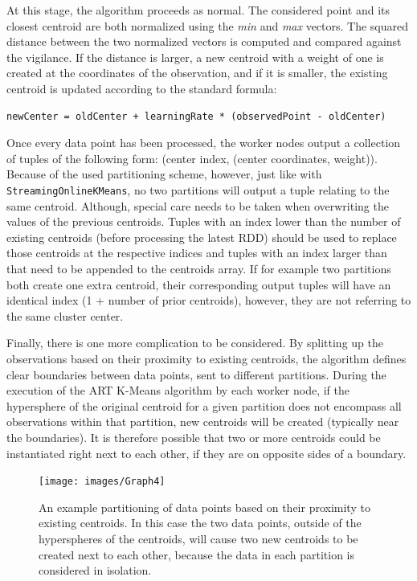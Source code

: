 \documentclass{l4proj}
\begin{document}
At this stage, the algorithm proceeds as normal. The considered point and its closest centroid are both normalized using the \textit{min} and \textit{max} vectors. The squared distance between the two normalized vectors is computed and compared against the vigilance. If the distance is larger, a new centroid with a weight of one is created at the coordinates of the observation, and if it is smaller, the existing centroid is updated according to the standard formula:

\begin{center}
\begin{BVerbatim}
newCenter = oldCenter + learningRate * (observedPoint - oldCenter)
\end{BVerbatim}
\end{center}

Once every data point has been processed, the worker nodes output a collection of tuples of the following form: (center index, (center coordinates, weight)). Because of the used partitioning scheme, however, just like with \texttt{StreamingOnlineKMeans}, no two partitions will output a tuple relating to the same centroid. Although, special care needs to be taken when overwriting the values of the previous centroids. Tuples with an index lower than the number of existing centroids (before processing the latest RDD) should be used to replace those centroids at the respective indices and tuples with an index larger than that need to be appended to the centroids array. If for example two partitions both create one extra centroid, their corresponding output tuples will have an identical index (1 + number of prior centroids), however, they are not referring to the same cluster center.

Finally, there is one more complication to be considered. By splitting up the observations based on their proximity to existing centroids, the algorithm defines clear boundaries between data points, sent to different partitions. During the execution of the ART K-Means algorithm by each worker node, if the hypersphere of the original centroid for a given partition does not encompass all observations within that partition, new centroids will be created (typically near the boundaries). It is therefore possible that two or more centroids could be instantiated right next to each other, if they are on opposite sides of a boundary.

\begin{figure}[H]
	\centering
    \label{grapgh-boundary}
    \texttt{[image: images/Graph4]}
    \caption{An example partitioning of data points based on their proximity to existing centroids. In this case the two data points, outside of the hyperspheres of the centroids, will cause two new centroids to be created next to each other, because the data in each partition is considered in isolation.} 
\end{figure}
\end{document}
